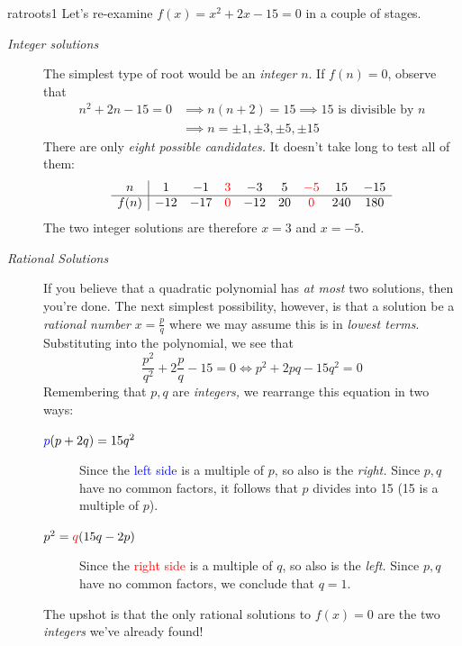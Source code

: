 \begin{example}{}{ratroots1}
	Let's re-examine $f(x)=x^2+2x-15=0$ in a couple of stages.
	\begin{description}
		\item[\normalfont\emph{Integer solutions}] The simplest type of root would be an \emph{integer} $n$. If $f(n)=0$, observe that
		\begin{align*}
			n^2+2n-15=0&\implies n(n+2)=15\implies \text{15 is divisible by $n$}\\
			&\implies n=\pm 1,\pm 3,\pm 5,\pm 15
		\end{align*}
		There are only \emph{eight possible candidates.} It doesn't take long to test all of them:
		\[
			\begin{array}{c|cccccccc}
				n&1&-1&\textcolor{red}{3}&-3&5&\textcolor{red}{-5}&15&-15\\\hline
				f(n)&-12&-17&\textcolor{red}{0}&-12&20&\textcolor{red}{0}&240&180
			\end{array}
		\]
		The two integer solutions are therefore $x=3$ and $x=-5$.
		\item[\normalfont\emph{Rational Solutions}] If you believe that a quadratic polynomial has \emph{at most} two solutions, then you're done. The next simplest possibility, however, is that a solution be a \emph{rational number} $x=\frac pq$ where we may assume this is in \emph{lowest terms}.\footnotemark{} Substituting into the polynomial, we see that
		\[
			\frac{p^2}{q^2}+2\frac pq-15=0\iff p^2+2pq-15q^2=0
		\]
		Remembering that $p,q$ are \emph{integers,} we rearrange this equation in two ways:
		\begin{description}
		  \item[$\textcolor{blue}{p}(p+2q)=15q^2$]\lstsp Since the \textcolor{blue}{left side} is a multiple of $p$, so also is the \emph{right.} Since $p,q$ have no common factors, it follows that $p$ divides into 15 (15 is a multiple of $p$).
		  \item[$p^2=\textcolor{red}{q}(15q-2p)$]\lstsp Since the \textcolor{red}{right side} is a multiple of $q$, so also is the \emph{left.} Since $p,q$ have no common factors, we conclude that $q=1$.
		\end{description}
		The upshot is that the only rational solutions to $f(x)=0$ are the two \emph{integers} we've already found!
	\end{description}
\end{example}


